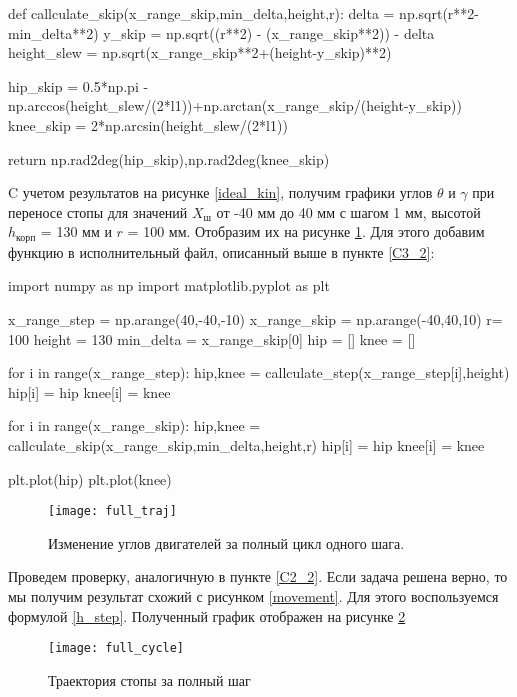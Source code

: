  \begin{python}
	def callculate_skip(x_range_skip,min_delta,height,r):
		delta = np.sqrt(r**2-min_delta**2)
		y_skip = np.sqrt((r**2) - (x_range_skip**2)) - delta
		height_slew = np.sqrt(x_range_skip**2+(height-y_skip)**2)
		
		hip_skip = 0.5*np.pi - np.arccos(height_slew/(2*l1))+np.arctan(x_range_skip/(height-y_skip))
		knee_skip = 2*np.arcsin(height_slew/(2*l1))
		
		return np.rad2deg(hip_skip),np.rad2deg(knee_skip)
\end{python}

C учетом результатов на рисунке \ref{ideal_kin}, получим графики углов $\theta$ и $\gamma$ при переносе стопы для значений $X_{\text{ш}}$ от -40 мм до 40 мм с шагом 1 мм, высотой $h_\text{корп}$ = 130 мм и $r$ = 100 мм. Отобразим их на рисунке \ref{full_traj}. Для этого добавим функцию в исполнительный файл, описанный выше в пункте \ref{C3_2}:
\newpage
\begin{python}
	import numpy as np
	import matplotlib.pyplot as plt
	
	x_range_step = np.arange(40,-40,-10)
	x_range_skip = np.arange(-40,40,10)
	r= 100
	height = 130
	min_delta = x_range_skip[0]
	hip = []
	knee = []
	
	for i in range(x_range_step):
		hip,knee = callculate_step(x_range_step[i],height)
		hip[i] = hip
		knee[i] = knee
	
	for i in range(x_range_skip):
		hip,knee = callculate_skip(x_range_skip,min_delta,height,r)
		hip[i] = hip
		knee[i] = knee
	
	plt.plot(hip)
	plt.plot(knee)
\end{python}

\begin{figure}[h!]
	\begin{center}
		\texttt{[image: full\_traj]}
		\caption{Изменение углов двигателей за полный цикл одного шага.}
		\label{full_traj}
	\end{center}
\end{figure}
\newpage
Проведем проверку, аналогичную в пункте \ref{C2_2}. Если задача решена верно, то мы получим результат схожий с рисунком \ref{movement}. Для этого воспользуемся формулой \ref{h_step}. Полученный график отображен на рисунке \ref{full_cycle}

\begin{figure}[h!]
	\begin{center}
		\texttt{[image: full\_cycle]}
		\caption{Траектория стопы за полный шаг}
		\label{full_cycle}
	\end{center}
\end{figure}

\newpage